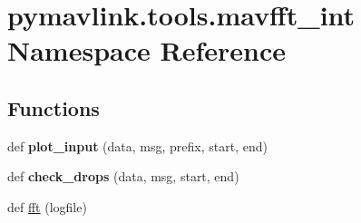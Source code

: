 \hypertarget{namespacepymavlink_1_1tools_1_1mavfft__int}{}\section{pymavlink.\+tools.\+mavfft\+\_\+int Namespace Reference}
\label{namespacepymavlink_1_1tools_1_1mavfft__int}
\subsection*{Functions}
\begin{DoxyCompactItemize}
\item 
\mbox{\label{namespacepymavlink_1_1tools_1_1mavfft__int_ad676e5d5d87b9d552609c8379fe67870}} 
def {\bfseries plot\+\_\+input} (data, msg, prefix, start, end)
\item 
\mbox{\label{namespacepymavlink_1_1tools_1_1mavfft__int_a2ae39ff09927a9ada359b47eeb6e4c32}} 
def {\bfseries check\+\_\+drops} (data, msg, start, end)
\item 
def \hyperlink{namespacepymavlink_1_1tools_1_1mavfft__int_a4fea48da53af74119f00f7ddc66f87fb}{fft} (logfile)
\end{DoxyCompactItemize}
